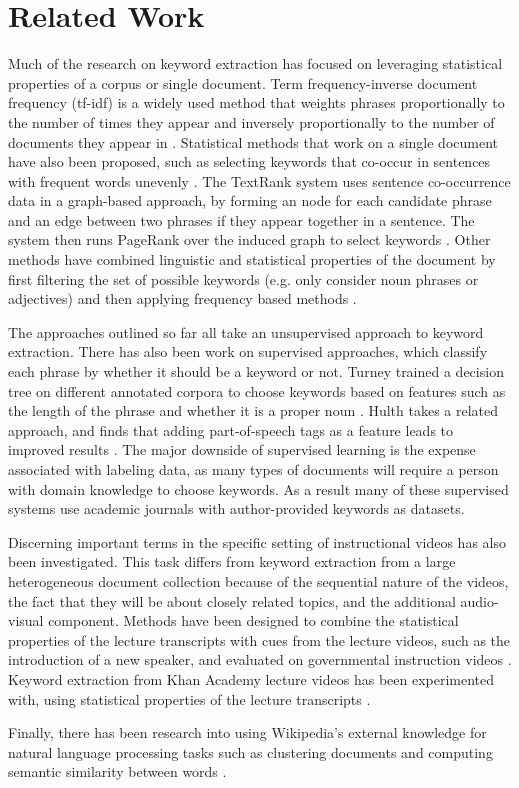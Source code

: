 \section{Related Work}
\label{sec:relWork}

Much of the research on keyword extraction has focused on leveraging statistical properties of a corpus or single document. Term frequency-inverse document frequency (tf-idf) is a widely used method that weights phrases proportionally to the number of times they appear and inversely proportionally to the number of documents they appear in \cite{mann2008}. Statistical methods that work on a single document have also been proposed, such as selecting keywords that co-occur in sentences with frequent words unevenly \cite{matsuo2004keyword}. The TextRank system uses sentence co-occurrence data in a graph-based approach, by forming an node for each candidate phrase and an edge between two phrases if they appear together in a sentence. The system then runs PageRank over the induced graph to select keywords \cite{mihalcea2004textrank}. Other methods have combined linguistic and statistical properties of the document by first filtering the set of possible keywords (e.g. only consider noun phrases or adjectives) and then applying frequency based methods \cite{rose2010automatic}.

The approaches outlined so far all take an unsupervised approach to keyword extraction. There has also been work on supervised approaches, which classify each phrase by whether it should be a keyword or not. Turney trained a decision tree on different annotated corpora to choose keywords based on features such as the length of the phrase and whether it is a proper noun \cite{turney1999learning}. Hulth takes a related approach, and finds that adding part-of-speech tags as a feature leads to improved results \cite{hulth2003improved}. The major downside of supervised learning is the expense associated with labeling data, as many types of documents will require a person with domain knowledge to choose keywords. As a result many of these supervised systems use academic journals with author-provided keywords as datasets.

Discerning important terms in the specific setting of instructional videos has also been investigated. This task differs from keyword extraction from a large heterogeneous document collection because of the sequential nature of the videos, the fact that they will be about closely related topics, and the additional audio-visual component. Methods have been designed to combine the statistical properties of the lecture transcripts with cues from the lecture videos, such as the introduction of a new speaker, and evaluated on governmental instruction videos \cite{park2006extracting}. Keyword extraction from Khan Academy lecture videos has been experimented with, using statistical properties of the lecture transcripts \cite{6337092}.

Finally, there has been research into using Wikipedia's external knowledge for natural language processing tasks such as clustering documents \cite{hu2009exploiting} and computing semantic similarity between words \cite{milne2007computing}.
